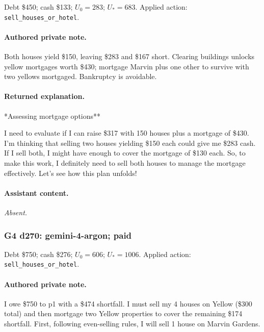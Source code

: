 Debt \$450; cash \$133; $U_0=283$; $U_*=683$. Applied action: \texttt{sell\_houses\_or\_hotel}.

\paragraph{Authored private note.}

{\small Both houses yield \$150, leaving \$283 and \$167 short. Clearing buildings unlocks yellow mortgages worth \$430; mortgage Marvin plus one other to survive with two yellows mortgaged. Bankruptcy is avoidable.\par}

\paragraph{Returned explanation.}

{\small **Assessing mortgage options**
\par
I need to evaluate if I can raise \$317 with 150 houses plus a mortgage of \$430. I'm thinking that selling two houses yielding \$150 each could give me \$283 cash. If I sell both, I might have enough to cover the mortgage of \$130 each. So, to make this work, I definitely need to sell both houses to manage the mortgage effectively. Let’s see how this plan unfolds!\par}

\paragraph{Assistant content.}

\textit{Absent.}

\medskip

\subsubsection*{G4 d270: gemini-4-argon; paid}

Debt \$750; cash \$276; $U_0=606$; $U_*=1006$. Applied action: \texttt{sell\_houses\_or\_hotel}.

\paragraph{Authored private note.}

{\small I owe \$750 to p1 with a \$474 shortfall. I must sell my 4 houses on Yellow (\$300 total) and then mortgage two Yellow properties to cover the remaining \$174 shortfall. First, following even-selling rules, I will sell 1 house on Marvin Gardens.\par}

